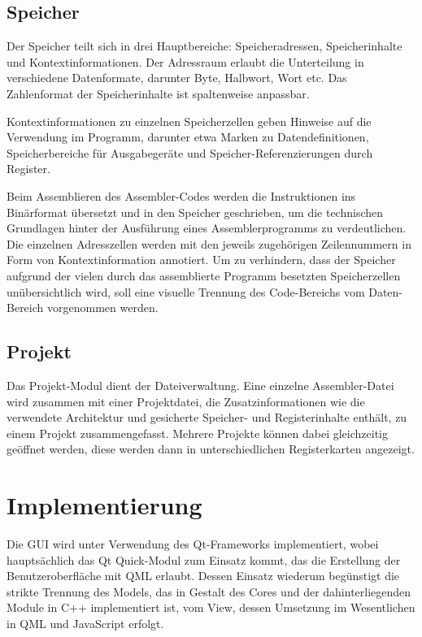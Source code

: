 \subsection{Speicher}

Der Speicher teilt sich in drei Hauptbereiche: Speicheradressen, Speicherinhalte und Kontextinformationen.
Der Adressraum erlaubt die Unterteilung in verschiedene Datenformate, darunter Byte, Halbwort, Wort etc.
Das Zahlenformat der Speicherinhalte ist spaltenweise anpassbar.

Kontextinformationen zu einzelnen Speicherzellen geben Hinweise auf die Verwendung im Programm, darunter etwa Marken zu Datendefinitionen, Speicherbereiche für Ausgabegeräte und Speicher-Referenzierungen durch Register.

Beim Assemblieren des Assembler-Codes werden die Instruktionen ins Binärformat übersetzt und in den Speicher geschrieben, um die technischen Grundlagen hinter der Ausführung eines Assemblerprogramms zu verdeutlichen. Die einzelnen Adresszellen werden mit den jeweils zugehörigen Zeilennummern in Form von Kontextinformation annotiert. Um zu verhindern, dass der Speicher aufgrund der vielen durch das assemblierte Programm besetzten Speicherzellen unübersichtlich wird, soll eine visuelle Trennung des Code-Bereichs vom Daten-Bereich vorgenommen werden.

\subsection{Projekt}

Das Projekt-Modul dient der Dateiverwaltung. Eine einzelne Assembler-Datei wird zusammen mit einer Projektdatei, die Zusatzinformationen wie die verwendete Architektur und gesicherte Speicher- und Registerinhalte enthält, zu einem Projekt zusammengefasst. Mehrere Projekte können dabei gleichzeitig geöffnet werden, diese werden dann in unterschiedlichen Registerkarten angezeigt.

\section{Implementierung}

Die GUI wird unter Verwendung des Qt-Frameworks implementiert, wobei hauptsächlich das Qt Quick-Modul zum Einsatz kommt, das die Erstellung der Benutzeroberfläche mit QML erlaubt. Dessen Einsatz wiederum begünstigt die strikte Trennung des Models, das in Gestalt des Cores und der dahinterliegenden Module in C++ implementiert ist, vom View, dessen Umsetzung im Wesentlichen in QML und JavaScript erfolgt.

